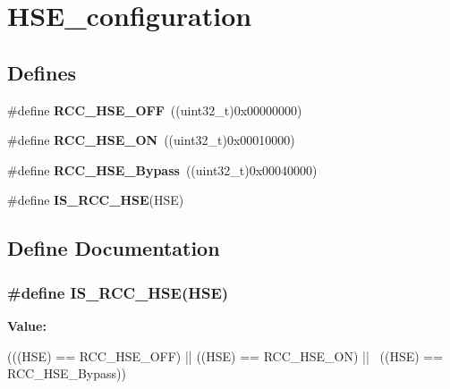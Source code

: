 \hypertarget{group__HSE__configuration}{
\section{HSE\_\-configuration}
\label{group__HSE__configuration}
}
\subsection*{Defines}
\begin{DoxyCompactItemize}
\item 
\hypertarget{group__HSE__configuration_ga1616626d23fbce440398578855df6f97}{
\#define {\bfseries RCC\_\-HSE\_\-OFF}~((uint32\_\-t)0x00000000)}
\label{group__HSE__configuration_ga1616626d23fbce440398578855df6f97}

\item 
\hypertarget{group__HSE__configuration_gabc4f70a44776c557af20496b04d9a9db}{
\#define {\bfseries RCC\_\-HSE\_\-ON}~((uint32\_\-t)0x00010000)}
\label{group__HSE__configuration_gabc4f70a44776c557af20496b04d9a9db}

\item 
\hypertarget{group__HSE__configuration_ga09061e9909d5f588baa7bfb0f7edd9fa}{
\#define {\bfseries RCC\_\-HSE\_\-Bypass}~((uint32\_\-t)0x00040000)}
\label{group__HSE__configuration_ga09061e9909d5f588baa7bfb0f7edd9fa}

\item 
\#define {\bfseries IS\_\-RCC\_\-HSE}(HSE)
\end{DoxyCompactItemize}


\subsection{Define Documentation}
\hypertarget{group__HSE__configuration_ga287bbcafd73d07ec915c2f793301908a}{
\subsubsection[{IS\_\-RCC\_\-HSE}]{\setlength{\rightskip}{0pt plus 5cm}\#define IS\_\-RCC\_\-HSE(HSE)}}
\label{group__HSE__configuration_ga287bbcafd73d07ec915c2f793301908a}
{\bfseries Value:}
\begin{DoxyCode}
(((HSE) == RCC_HSE_OFF) || ((HSE) == RCC_HSE_ON) || \
                         ((HSE) == RCC_HSE_Bypass))
\end{DoxyCode}
